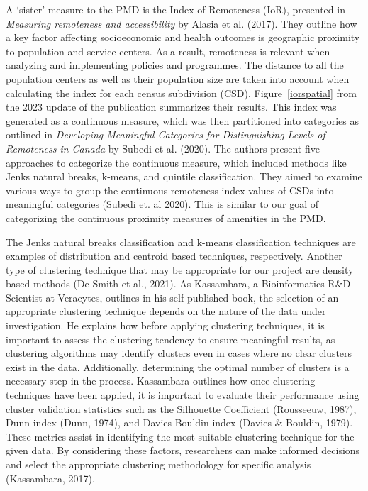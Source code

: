 \documentclass[11pt, a4paper]{article}
\begin{document}
A `sister' measure to the PMD is the Index of Remoteness (IoR), presented in \textit{Measuring remoteness and accessibility} by Alasia et al. (2017). They outline how a  key  factor  affecting  socioeconomic  and  health outcomes is geographic proximity to population and service centers. As a result, remoteness is relevant when analyzing and implementing policies and programmes. The distance to all the population centers as well as their population size are taken into account when calculating the index for each census subdivision (CSD). Figure~\ref{iorspatial} from the 2023 update of the publication summarizes their results. This index was generated as a continuous measure, which was then partitioned into categories as outlined in \textit{Developing Meaningful Categories for Distinguishing Levels of Remoteness in Canada} by Subedi et al. (2020).  The authors present five approaches to categorize the continuous measure, which included methods like Jenks natural breaks, k-means, and quintile classification. They aimed to examine various ways to group the continuous remoteness index values of CSDs into meaningful categories (Subedi et.  al 2020). This is similar to our goal of categorizing the continuous proximity measures of amenities in the PMD.
\par
The Jenks natural breaks classification and k-means classification techniques are examples of distribution and centroid based techniques, respectively. Another type of clustering technique that may be appropriate for our project are density based methods (De Smith et al., 2021). As Kassambara, a Bioinformatics R\&D Scientist at Veracytes, outlines in his self-published book, the selection of an appropriate clustering technique depends on the nature of the data under investigation. He explains how before applying clustering techniques, it is important to assess the clustering tendency to ensure meaningful results, as clustering algorithms may identify clusters even in cases where no clear clusters exist in the data. Additionally, determining the optimal number of clusters is a necessary step in the process.  Kassambara outlines how once clustering techniques have been applied, it is important to evaluate their performance using cluster validation statistics such as the Silhouette Coefficient (Rousseeuw, 1987), Dunn index (Dunn, 1974), and Davies Bouldin index (Davies \& Bouldin, 1979). These metrics assist in identifying the most suitable clustering technique for the given data. By considering these factors, researchers can make informed decisions and select the appropriate clustering methodology for specific analysis (Kassambara, 2017).
\end{document}

